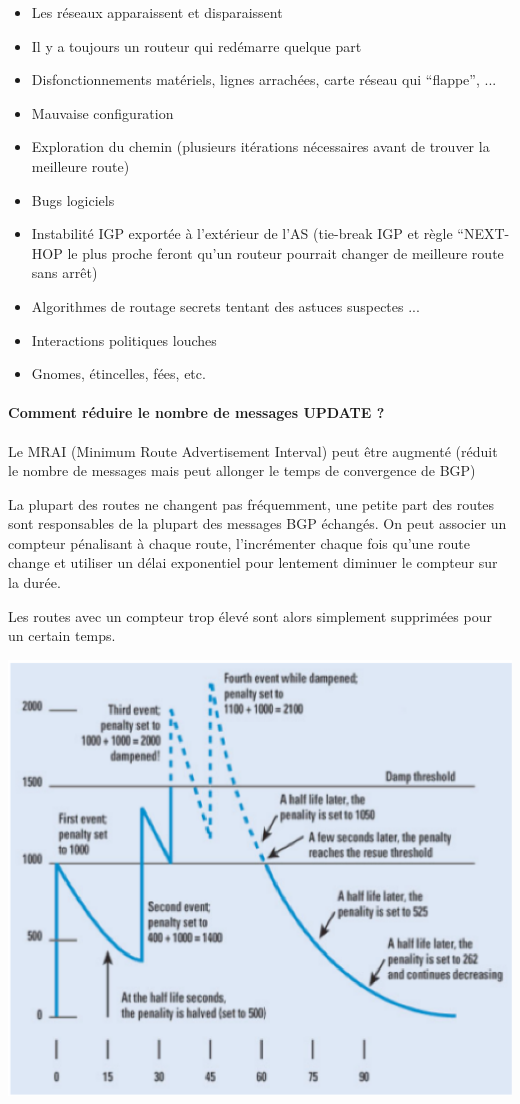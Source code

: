 \documentclass{report}
\begin{document}
\begin{itemize}
\item Les réseaux apparaissent et disparaissent
\item Il y a toujours un routeur qui redémarre quelque part
\item Disfonctionnements matériels, lignes arrachées, carte réseau qui
  ``flappe'', ...
\item Mauvaise configuration
\item Exploration du chemin (plusieurs itérations nécessaires avant de
  trouver la meilleure route)
\item Bugs logiciels
\item Instabilité IGP exportée à l'extérieur de l'AS (tie-break IGP et
  règle ``NEXT-HOP le plus proche feront qu'un routeur pourrait
  changer de meilleure route sans arrêt)
\item Algorithmes de routage secrets tentant des astuces suspectes ...
\item Interactions politiques louches
\item Gnomes, étincelles, fées, etc.
\end{itemize}

\paragraph{Comment réduire le nombre de messages UPDATE ?}

Le MRAI (Minimum Route Advertisement Interval) peut être augmenté
(réduit le nombre de messages mais peut allonger le temps de
convergence de BGP)

La plupart des routes ne changent pas fréquemment, une petite part des
routes sont responsables de la plupart des messages BGP échangés. On
peut associer un compteur pénalisant à chaque route, l'incrémenter
chaque fois qu'une route change et utiliser un délai exponentiel pour
lentement diminuer le compteur sur la durée.

Les routes avec un compteur trop élevé sont alors simplement
supprimées pour un certain temps.

\includegraphics[width=\textwidth]{bgpdampening.eps}
\end{document}
